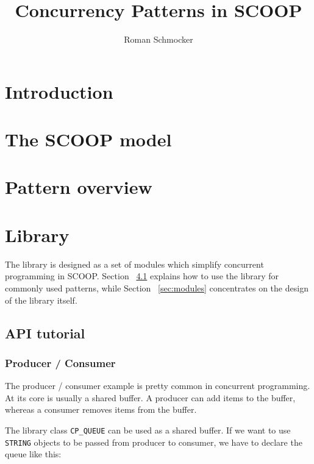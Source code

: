 \documentclass[a4paper,10pt]{report}
\title{Concurrency Patterns in SCOOP}
\author{Roman Schmocker}
\begin{document}
\maketitle

\begin{abstract}

\end{abstract}

\tableofcontents

\section{Introduction}

\section {The SCOOP model}

\section {Pattern overview}



\section {Library}

The library is designed as a set of modules which simplify concurrent programming in SCOOP.
Section ~\ref{sec:tutorial} explains how to use the library for commonly used patterns,
while Section ~\ref{sec:modules} concentrates on the design of the library itself.

\subsection {API tutorial}
\label{sec:tutorial}

\subsubsection{Producer / Consumer}

The producer / consumer example is pretty common in concurrent programming.
At its core is usually a shared buffer.
A producer can add items to the buffer, whereas a consumer removes items from the buffer.

The library class \lstinline!CP_QUEUE! can be used as a shared buffer.
If we want to use \lstinline!STRING! objects to be passed from producer to consumer, we have to declare the queue like this:
\end{document}
